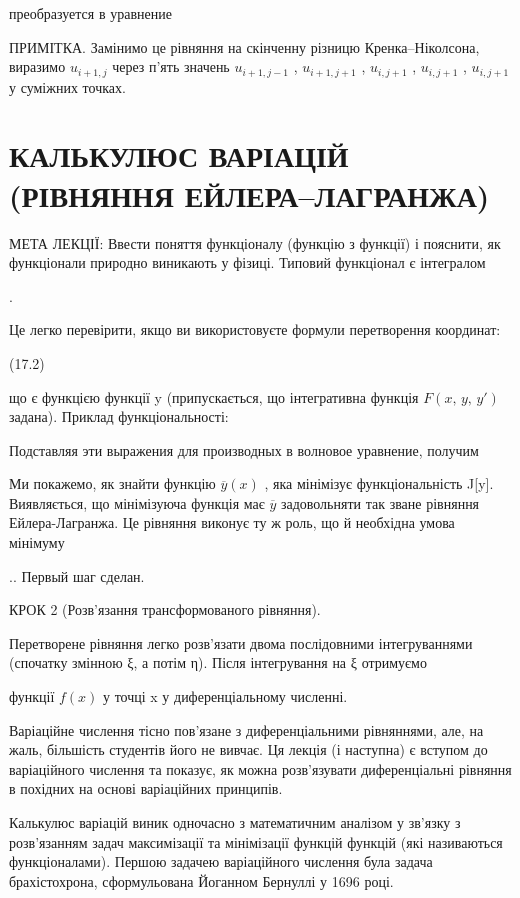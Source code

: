 \documentclass[
  ukrainian,
]{article}
\begin{document}
преобразуется в уравнение

ПРИМІТКА. Замінимо це рівняння на скінченну різницю Кренка--Ніколсона,
виразимо \(u_{i+1,j}\) через п'ять значень \(u_{i+1,j-1}\) ,
\(u_{i+1,j+1}\) , \(u_{i,j+1}\) , \(u_{i,j+1}\) , \(u_{i,j+1}\) у
суміжних точках.

\section{КАЛЬКУЛЮС ВАРІАЦІЙ (РІВНЯННЯ
ЕЙЛЕРА--ЛАГРАНЖА)}\label{ux43aux430ux43bux44cux43aux443ux43bux44eux441-ux432ux430ux440ux456ux430ux446ux456ux439-ux440ux456ux432ux43dux44fux43dux43dux44f-ux435ux439ux43bux435ux440ux430ux43bux430ux433ux440ux430ux43dux436ux430}

МЕТА ЛЕКЦІЇ: Ввести поняття функціоналу (функцію з функції) і пояснити,
як функціонали природно виникають у фізиці. Типовий функціонал є
інтегралом

.

Це легко перевірити, якщо ви використовуєте формули перетворення
координат:

(17.2)

що є функцією функції y (припускається, що інтегративна функція
\(F\left(x,\,y,\,y'\right)\) задана). Приклад функціональності:

Подставляя эти выражения для производных в волновое уравнение, получим

Ми покажемо, як знайти функцію \(\overline{y}(x)\) , яка мінімізує
функціональність J{[}y{]}. Виявляється, що мінімізуюча функція має
\(\overline{y}\) задовольняти так зване рівняння Ейлера-Лагранжа. Це
рівняння виконує ту ж роль, що й необхідна умова мінімуму

.. Первый шаг сделан.

КРОК 2 (Розв'язання трансформованого рівняння).

Перетворене рівняння легко розв'язати двома послідовними інтегруваннями
(спочатку змінною ξ, а потім η). Після інтегрування на ξ отримуємо

функції \(f(x)\) у точці x у диференціальному численні.

Варіаційне числення тісно пов'язане з диференціальними рівняннями, але,
на жаль, більшість студентів його не вивчає. Ця лекція (і наступна) є
вступом до варіаційного числення та показує, як можна розв'язувати
диференціальні рівняння в похідних на основі варіаційних принципів.

Калькулюс варіацій виник одночасно з математичним аналізом у зв'язку з
розв'язанням задач максимізації та мінімізації функцій функцій (які
називаються функціоналами). Першою задачею варіаційного числення була
задача брахістохрона, сформульована Йоганном Бернуллі у 1696 році.
\end{document}

